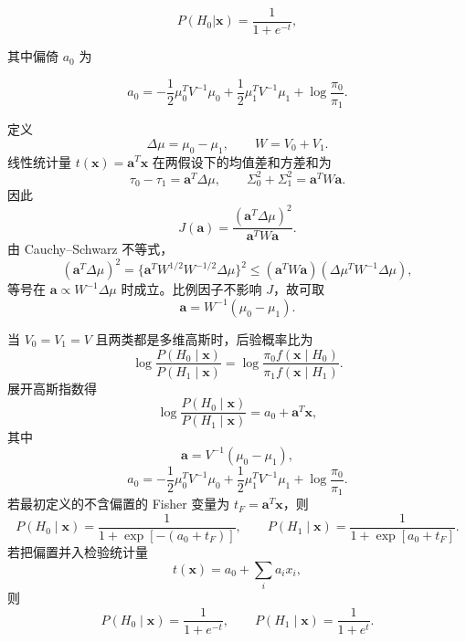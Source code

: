 \begin{question}
\begin{enumerate}
\[
P(H_0|\mathbf{x})=\frac{1}{1+e^{-t}},
\]

其中偏倚 \(a_0\) 为

\[
a_0=-\frac12\mu_0^T V^{-1}\mu_0+\frac12\mu_1^T V^{-1}\mu_1+\log\frac{\pi_0}{\pi_1}.
\]
\end{enumerate}
\begin{solution}
定义
\[
\Delta\mu=\mu_0-\mu_1,
\qquad
W=V_0+V_1.
\]
线性统计量 \(t(\mathbf x)=\mathbf a^T\mathbf x\) 在两假设下的均值差和方差和为
\[
\tau_0-\tau_1=\mathbf a^T\Delta\mu,
\qquad
\Sigma_0^2+\Sigma_1^2=\mathbf a^TW\mathbf a.
\]
因此
\[
J(\mathbf a)=\frac{(\mathbf a^T\Delta\mu)^2}{\mathbf a^TW\mathbf a}.
\]
由 Cauchy--Schwarz 不等式，
\[
(\mathbf a^T\Delta\mu)^2
=\{\mathbf a^T W^{1/2}W^{-1/2}\Delta\mu\}^2
\le (\mathbf a^TW\mathbf a)(\Delta\mu^TW^{-1}\Delta\mu),
\]
等号在 \(\mathbf a\propto W^{-1}\Delta\mu\) 时成立。比例因子不影响
\(J\)，故可取
\[
\mathbf a=W^{-1}(\mu_0-\mu_1).
\]

当 \(V_0=V_1=V\) 且两类都是多维高斯时，后验概率比为
\[
\log\frac{P(H_0\mid\mathbf x)}{P(H_1\mid\mathbf x)}
=\log\frac{\pi_0f(\mathbf x\mid H_0)}{\pi_1f(\mathbf x\mid H_1)}.
\]
展开高斯指数得
\[
\log\frac{P(H_0\mid\mathbf x)}{P(H_1\mid\mathbf x)}
=a_0+\mathbf a^T\mathbf x,
\]
其中
\[
\mathbf a=V^{-1}(\mu_0-\mu_1),
\]
\[
a_0=-\frac12\mu_0^TV^{-1}\mu_0
+\frac12\mu_1^TV^{-1}\mu_1+
\log\frac{\pi_0}{\pi_1}.
\]
若最初定义的不含偏置的 Fisher 变量为 \(t_F=\mathbf a^T\mathbf x\)，则
\[
P(H_0\mid\mathbf x)=
\frac{1}{1+\exp[-(a_0+t_F)]},
\qquad
P(H_1\mid\mathbf x)=
\frac{1}{1+\exp[a_0+t_F]}.
\]
若把偏置并入检验统计量
\[
t(\mathbf x)=a_0+\sum_i a_ix_i,
\]
则
\[
P(H_0\mid\mathbf x)=\frac{1}{1+e^{-t}},
\qquad
P(H_1\mid\mathbf x)=\frac{1}{1+e^{t}}.
\]
\end{solution}
\end{question}


